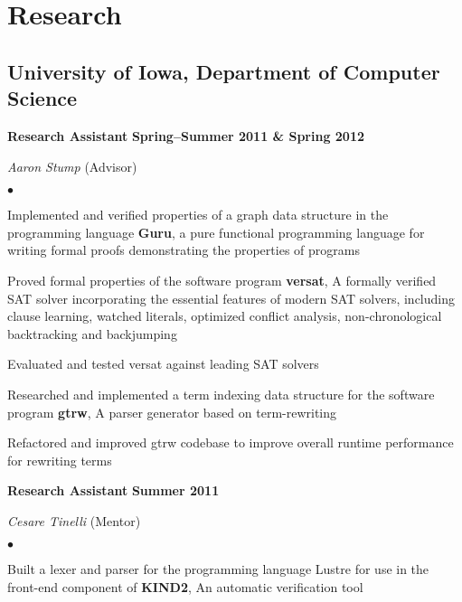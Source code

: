 \documentclass[10pt,letterpaper]{article}
\renewenvironment{itemize}{
  \begin{list}{}{
      \setlength{\leftmargin}{1.5em}
      \setlength{\itemsep}{0.25em}
      \setlength{\parskip}{0pt}
      \setlength{\parsep}{0.25em}
    }
  }{
  \end{list}
}
\newenvironment{bitemize}{
  \begin{list}{\(\bullet \)}{
      \setlength{\leftmargin}{1.5em}
      \setlength{\itemsep}{0.25em}
      \setlength{\parskip}{0pt}
      \setlength{\parsep}{0.25em}
    }
  }{
  \end{list}
}
\newcommand{\yearrange}[1]{\hfill \textbf{#1} \par}
\begin{document}
\section*{Research}

\subsection*{University of Iowa, Department of Computer Science}

\begin{itemize}
\item \textbf{Research Assistant} \yearrange{Spring--Summer 2011 %
    \& Spring 2012}
  \textit{Aaron Stump} (Advisor)
  \begin{bitemize}
  \item Implemented and verified properties of a graph data structure in the
    programming language \textbf{Guru}, a pure functional programming language
    for writing formal proofs demonstrating the properties of programs
  \item Proved formal properties of the software program \textbf{versat}, A
    formally verified SAT solver incorporating the essential features of modern
    SAT solvers, including clause learning, watched literals, optimized conflict
    analysis, non-chronological backtracking and backjumping
  \item Evaluated and tested versat against leading SAT solvers
  \item Researched and implemented a term indexing data structure for the
    software program \textbf{gtrw}, A parser generator based on term-rewriting
  \item Refactored and improved gtrw codebase to improve overall runtime
    performance for rewriting terms
  \end{bitemize}
\item \textbf{Research Assistant} \yearrange{Summer 2011} \textit{Cesare
  Tinelli} (Mentor)
  \begin{bitemize}
  \item Built a lexer and parser for the programming language Lustre for use in
    the front-end component of \textbf{KIND2}, An automatic verification tool

\end{bitemize}
\end{itemize}
\end{document}
